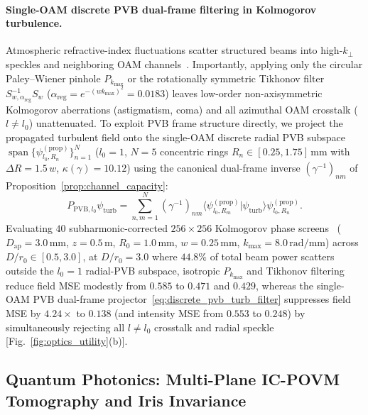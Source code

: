 \documentclass[aps,pra,reprint,amsmath,amssymb,floatfix,longbibliography]{revtex4-2}
\providecommand{\braket}[2]{\langle#1\vert#2\rangle}
\begin{document}
\paragraph*{Single-OAM discrete PVB dual-frame filtering in Kolmogorov turbulence.}
Atmospheric refractive-index fluctuations scatter structured beams into high-$k_\perp$ speckles and neighboring OAM channels~\cite{Paterson2005,TylerBoyd2009,AndrewsPhillips2005}. Importantly, applying only the circular Paley--Wiener pinhole $P_{k_{\max}}$ or the rotationally symmetric Tikhonov filter $S_{w,\alpha_{\mathrm{reg}}}^{-1}S_w$ ($\alpha_{\mathrm{reg}} = e^{-(w k_{\max})^2} = 0.0183$) leaves low-order non-axisymmetric Kolmogorov aberrations (astigmatism, coma) and all azimuthal OAM crosstalk ($l \neq l_0$) unattenuated. To exploit PVB frame structure directly, we project the propagated turbulent field onto the single-OAM discrete radial PVB subspace $\operatorname{span}\{\psi_{l_0,R_n}^{(\mathrm{prop})}\}_{n=1}^N$ ($l_0 = 1$, $N = 5$ concentric rings $R_n \in [0.25, 1.75]\,\mathrm{mm}$ with $\Delta R = 1.5\,w$, $\kappa(\gamma) = 10.12$) using the canonical dual-frame inverse $(\gamma^{-1})_{nm}$ of Proposition~\ref{prop:channel_capacity}:
\begin{equation}
P_{\mathrm{PVB},l_0}\psi_{\mathrm{turb}} = \sum_{n,m=1}^N (\gamma^{-1})_{nm}\braket{\psi_{l_0,R_m}^{(\mathrm{prop})}}{\psi_{\mathrm{turb}}}\psi_{l_0,R_n}^{(\mathrm{prop})}.
\label{eq:discrete_pvb_turb_filter}
\end{equation}
Evaluating $40$ subharmonic-corrected $256\times 256$ Kolmogorov phase screens~\cite{Lane1992} ($D_{\mathrm{ap}} = 3.0\,\mathrm{mm}$, $z = 0.5\,\mathrm{m}$, $R_0 = 1.0\,\mathrm{mm}$, $w = 0.25\,\mathrm{mm}$, $k_{\max} = 8.0\,\mathrm{rad/mm}$) across $D/r_0 \in [0.5, 3.0]$, at $D/r_0 = 3.0$ where $44.8\%$ of total beam power scatters outside the $l_0 = 1$ radial-PVB subspace, isotropic $P_{k_{\max}}$ and Tikhonov filtering reduce field MSE modestly from $0.585$ to $0.471$ and $0.429$, whereas the single-OAM PVB dual-frame projector~\eqref{eq:discrete_pvb_turb_filter} suppresses field MSE by $4.24\times$ to $0.138$ (and intensity MSE from $0.553$ to $0.248$) by simultaneously rejecting all $l \neq l_0$ crosstalk and radial speckle [Fig.~\ref{fig:optics_utility}(b)].

\subsection{Quantum Photonics: Multi-Plane IC-POVM Tomography and Iris Invariance}
\label{subsec:quantum_utility}
\end{document}
